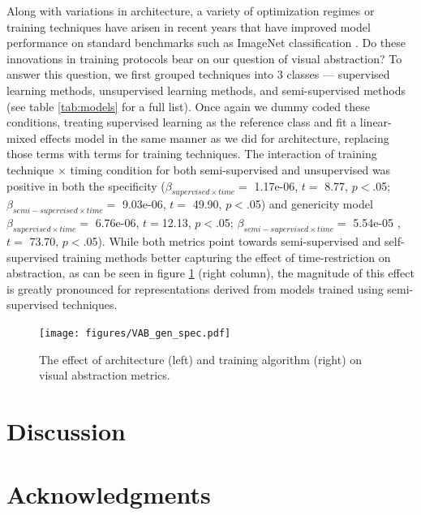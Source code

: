 \documentclass[10pt,letterpaper]{article}
\begin{document}
Along with variations in architecture, a variety of optimization regimes or training techniques have arisen in recent years that have improved model performance on standard benchmarks such as ImageNet classification \cite{deng2009imagenet}. Do these innovations in training protocols bear on our question of visual abstraction? 
To answer this question, we first grouped techniques into 3 classes — supervised learning methods, unsupervised learning methods, and semi-supervised methods (see table \ref{tab:models} for a full list). Once again we dummy coded these conditions, treating supervised learning as the reference class and fit a linear-mixed effects model in the same manner as we did for architecture, replacing those terms with terms for training techniques. The interaction of training technique $\times$ timing condition for both semi-supervised and unsupervised was positive in both the specificity ($\beta_{supervised \times time}= $ 1.17e-06, $t =$ 8.77, $p<$.05; $\beta_{semi-supervised \times time}= $ 9.03e-06, $t =$ 49.90, $p<$.05) and genericity model $\beta_{supervised \times time}= $ 6.76e-06, $t =$12.13, $p<$.05; $\beta_{semi-supervised \times time}= $ 5.54e-05 , $t =$ 73.70, $p<$.05).
While both metrics point towards semi-supervised and self-supervised training methods better capturing the effect of time-restriction on abstraction, as can be seen in figure \ref{fig:gen_spec} (right column), the magnitude of this effect is greatly pronounced for representations derived from models trained using semi-supervised techniques.



\begin{figure}
    \centering
    \texttt{[image: figures/VAB\_gen\_spec.pdf]}
    \caption{The effect of architecture (left) and training algorithm (right) on visual abstraction metrics. }
    \label{fig:gen_spec}
\end{figure}


\section{Discussion}

\section{Acknowledgments}





\setlength{\bibleftmargin}{.125in}
\setlength{\bibindent}{-\bibleftmargin}


\end{document}
